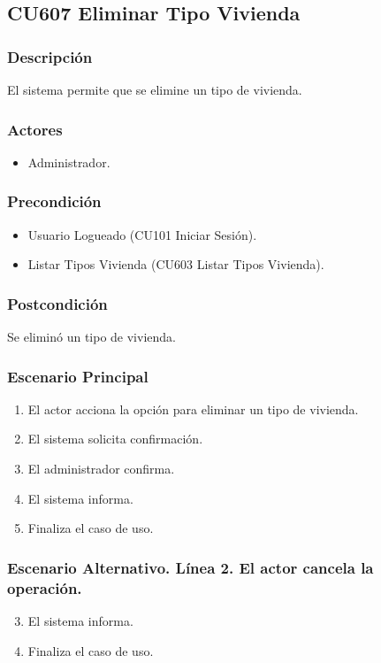 \subsection{CU607 Eliminar Tipo Vivienda}
\subsubsection{Descripci\'{o}n}
El sistema permite que se elimine un tipo de vivienda.
\subsubsection{Actores}
\begin{itemize}
\item Administrador.
\end{itemize}
\subsubsection{Precondici\'{o}n}
\begin{itemize}
\item Usuario Logueado (CU101 Iniciar Sesi\'{o}n).
\item Listar Tipos Vivienda (CU603 Listar Tipos Vivienda).
\end{itemize}
\subsubsection{Postcondici\'{o}n}
Se elimin\'{o} un tipo de vivienda.
\subsubsection{Escenario Principal}
\begin{enumerate}
\item El actor acciona la opci\'{o}n para eliminar un tipo de vivienda.
\item El sistema solicita confirmaci\'{o}n.
\item El administrador confirma.
\item El sistema informa.
\item Finaliza el caso de uso.
\end{enumerate}
\subsubsection{Escenario Alternativo. L\'{i}nea 2. El actor cancela la operaci\'{o}n.}
\begin{enumerate}
\setcounter{enumi}{2}
\item El sistema informa.
\item Finaliza el caso de uso.
\end{enumerate}
